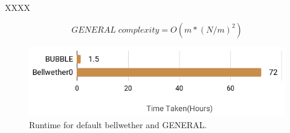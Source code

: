 \documentclass[10pt,journal,compsoc]{IEEEtran}
\begin{document}
XXXX


\begin{equation}
\label{eq:GENERAL}
    {GENERAL\; complexity } =  O(m*(N/m)^2)
\end{equation}


\begin{figure}
    \centering
    \includegraphics[width=\linewidth]{figs/time.png}
    \caption{Runtime for default bellwether and GENERAL.}
    \label{fig:time}
\end{figure}
\end{document}
